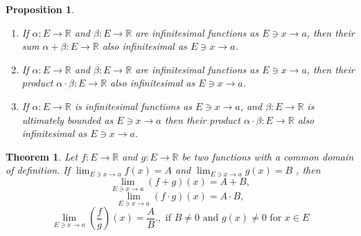 \documentclass[a4paper,12pt]{article} %
\newtheorem{theorem}{Theorem}[section]
\newtheorem{proposition}{Proposition}[section]
\begin{document}
\begin{proposition}
    \begin{enumerate}
        \item If $\displaystyle \alpha: E \to \mathbb{R}$ and $\displaystyle 
            \beta: E \to \mathbb{R}$ are infinitesimal functions as 
            $\displaystyle E \ni x \to a$, then their sum $\alpha + 
            \beta: E \to \mathbb{R}$ also infinitesimal as $E \ni x \to a$.

        \item If $\displaystyle \alpha: E \to \mathbb{R}$ and $\displaystyle 
            \beta: E \to \mathbb{R}$ are infinitesimal functions as 
            $\displaystyle E \ni x \to a$, then their product $\alpha \cdot 
            \beta: E \to \mathbb{R}$ also infinitesimal as $E \ni x \to a$.
        \item If $\displaystyle \alpha: E \to \mathbb{R}$ is infinitesimal functions as 
            $\displaystyle E \ni x \to a$, and $\displaystyle 
            \beta: E \to \mathbb{R}$ is ultimately bounded as $\displaystyle 
            E \ni x \to a$ then their product $\alpha \cdot 
            \beta: E \to \mathbb{R}$ also infinitesimal as $E \ni x \to a$.
    \end{enumerate}
\end{proposition}

\begin{theorem}
    Let $\displaystyle f: E \to \mathbb{R}$ and $g: E \to \mathbb{R}$
    be two functions with a common domain of definition.
    If $\displaystyle \lim_{E \ni x \to a}f(x) = A$  and 
       $\displaystyle \lim_{E \ni x \to a}g(x) = B$ , then 
    \[
        \lim_{E \ni x \to a}\left(f+g\right)(x) = A + B,
        \]
    \[
        \lim_{E \ni x \to a}\left(f\cdot g\right)(x) = A\cdot B,
        \]
    \[
        \lim_{E \ni x \to a}\left(\frac{f}{g}\right)(x) = \frac{A}{B}.
        , \mbox{ if } B \ne 0 \mbox{ and } g(x) \ne 0 \mbox{ for } 
        x \in E
        \]
\end{theorem}
\end{document}
